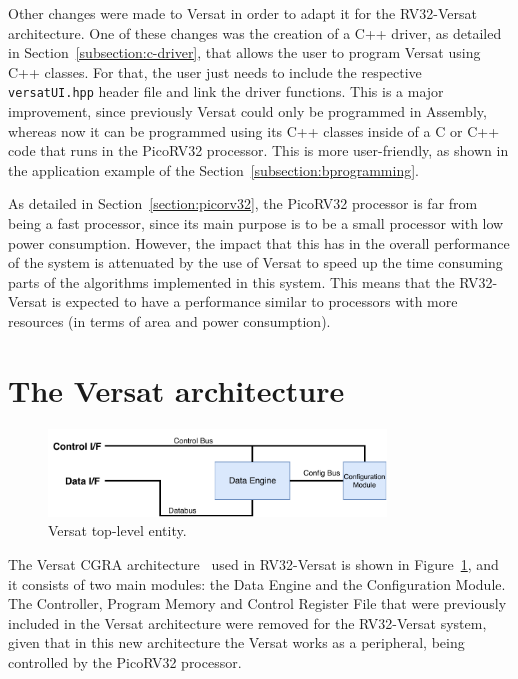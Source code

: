 Other changes were made to Versat in order to adapt it for the RV32-Versat
architecture. One of these changes was the creation of a C++ driver, as detailed
in Section~\ref{subsection:c-driver}, that allows the user to program Versat
using C++ classes. For that, the user just needs to include the respective {\tt
  versatUI.hpp} header file and link the driver functions. This is a major
improvement, since previously Versat could only be programmed in Assembly,
whereas now it can be programmed using its C++ classes inside of a C or C++ code
that runs in the PicoRV32 processor. This is more user-friendly, as shown in the
application example of the Section~\ref{subsection:bprogramming}.

As detailed in Section~\ref{section:picorv32}, the PicoRV32 processor is far
from being a fast processor, since its main purpose is to be a small processor
with low power consumption. However, the impact that this has in the overall
performance of the system is attenuated by the use of Versat to speed up the
time consuming parts of the algorithms implemented in this system. This means
that the RV32-Versat is expected to have a performance similar to processors
with more resources (in terms of area and power consumption).


\section{The Versat architecture}
\label{section:versat}

\begin{figure}[!htb]
	\centering
	\includegraphics[width=0.8\textwidth]{Figures/top.pdf}
	\caption{Versat top-level entity.}
	\label{fig:top}
\end{figure}

The Versat CGRA architecture~\cite{sousa:versat, sousa:versat2016,
  sousa:controller, sousa:compiler, versat:specification} used in RV32-Versat is
shown in Figure~\ref{fig:top}, and it consists of two main modules: the Data
Engine and the Configuration Module. The Controller, Program Memory and Control
Register File that were previously included in the Versat architecture were
removed for the RV32-Versat system, given that in this new architecture the
Versat works as a peripheral, being controlled by the PicoRV32 processor.

